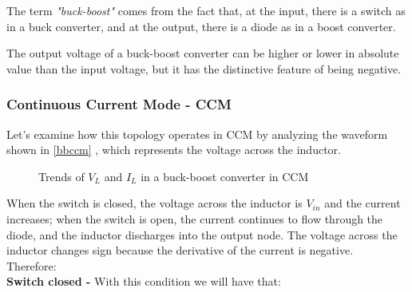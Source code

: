 \documentclass[../main.tex]{subfiles}
\begin{document}
The term \textit{"buck-boost"} comes from the fact that, at the input, there is a switch as in a buck converter, and at the output, there is a diode as in a boost converter. 

The output voltage of a buck-boost converter can be higher or lower in absolute value than the input voltage, but it has the distinctive feature of being negative.

\subsubsection*{Continuous Current Mode - CCM}

Let’s examine how this topology operates in CCM by analyzing the waveform shown in \autoref{bbccm} , which represents the voltage across the inductor. 

\begin{figure}[h!]
\begin{center}




\label{bbccm}
\caption{Trends of $V_L$ and $I_L$ in a buck-boost converter in CCM}	
\end{center}
\end{figure}



When the switch is closed, the voltage across the inductor is $V_{in}$ and the current increases; when the switch is open, the current continues to flow through the diode, and the inductor discharges into the output node. The voltage across the inductor changes sign because the derivative of the current is negative. \\

Therefore:\\

\textbf{Switch closed -} With this condition we will have that:
\end{document}
